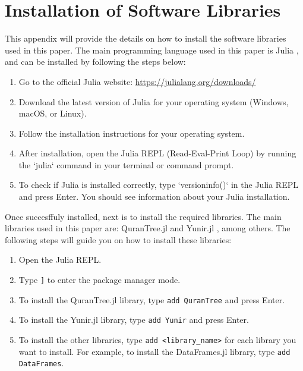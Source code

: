 \chapter{Installation of Software Libraries}
\label{appendix:installation_libraries}
This appendix will provide the details on how to install the software libraries used in this paper. The main programming language used in this paper is Julia \cite{Julia2017}, and can be installed by following the steps below:

\begin{enumerate}
    \item Go to the official Julia website: \url{https://julialang.org/downloads/}
    \item Download the latest version of Julia for your operating system (Windows, macOS, or Linux).
    \item Follow the installation instructions for your operating system.
    \item After installation, open the Julia REPL (Read-Eval-Print Loop) by running the `julia` command in your terminal or command prompt.
    \item To check if Julia is installed correctly, type `versioninfo()` in the Julia REPL and press Enter. You should see information about your Julia installation.
\end{enumerate}

Once succesffuly installed, next is to install the required libraries. The main libraries used in this paper are: QuranTree.jl \cite{asaad2021qurantree} and Yunir.jl \cite{al_ahmadgaid_b_asaad_yunir}, among others. The following steps will guide you on how to install these libraries:
\begin{enumerate}
    \item Open the Julia REPL.
    \item Type \verb|]| to enter the package manager mode.
    \item To install the QuranTree.jl library, type \verb|add QuranTree| and press Enter.
    \item To install the Yunir.jl library, type \verb|add Yunir| and press Enter.
    \item To install the other libraries, type \verb|add <library_name>| for each library you want to install. For example, to install the DataFrames.jl library, type \verb|add DataFrames|.
\end{enumerate}
